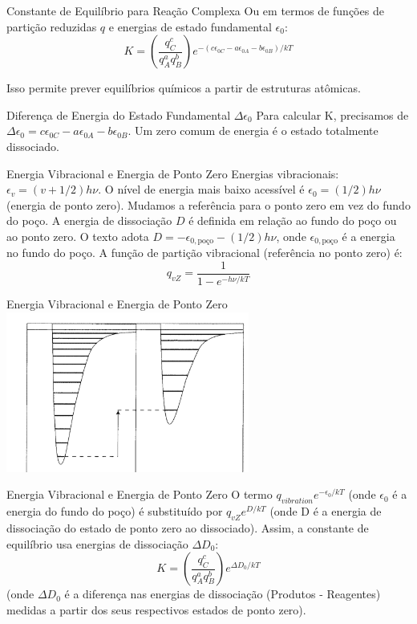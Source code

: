 \documentclass{beamer}
\begin{document}
\begin{frame}{Constante de Equilíbrio para Reação Complexa}
        Ou em termos de funções de partição reduzidas $q$ e energias de estado fundamental $\epsilon_0$:
        $$ K = \left(\frac{q_C^c}{q_A^a q_B^b}\right) e^{-(c\epsilon_{0C} - a\epsilon_{0A} - b\epsilon_{0B})/kT} $$
        
        Isso permite prever equilíbrios químicos a partir de estruturas atômicas.
\end{frame}

\begin{frame}{Diferença de Energia do Estado Fundamental $\Delta\epsilon_0$}
        Para calcular K, precisamos de $\Delta\epsilon_0 = c\epsilon_{0C} - a\epsilon_{0A} - b\epsilon_{0B}$.
        Um zero comum de energia é o estado totalmente dissociado. 
\end{frame}

\begin{frame}{Energia Vibracional e Energia de Ponto Zero}
        Energias vibracionais: $\epsilon_v = (v + 1/2)h\nu$. O nível de energia mais baixo acessível é $\epsilon_0 = (1/2)h\nu$ (energia de ponto zero). 
        Mudamos a referência para o ponto zero em vez do fundo do poço.
        A energia de dissociação $D$ é definida em relação ao fundo do poço ou ao ponto zero. O texto adota $D = -\epsilon_{0,\text{poço}} - (1/2)h\nu$, onde $\epsilon_{0,\text{poço}}$ é a energia no fundo do poço. 
        A função de partição vibracional (referência no ponto zero) é:
        $$ q_{vZ} = \frac{1}{1 - e^{-h\nu/kT}} $$
         
\end{frame}


\begin{frame}{Energia Vibracional e Energia de Ponto Zero}
\includegraphics[width=0.6\textwidth]{figs/poco.png}
\end{frame}
    \begin{frame}{Energia Vibracional e Energia de Ponto Zero}
        O termo $q_{vibration} e^{-\epsilon_0/kT}$ (onde $\epsilon_0$ é a energia do fundo do poço) é substituído por $q_{vZ} e^{D/kT}$ (onde D é a energia de dissociação do estado de ponto zero ao dissociado).
        Assim, a constante de equilíbrio usa energias de dissociação $\Delta D_0$:
        $$ K = \left(\frac{q_C^c}{q_A^a q_B^b}\right) e^{\Delta D_0/kT} $$
        (onde $\Delta D_0$ é a diferença nas energias de dissociação (Produtos - Reagentes) medidas a partir dos seus respectivos estados de ponto zero).
\end{frame}
\end{document}
